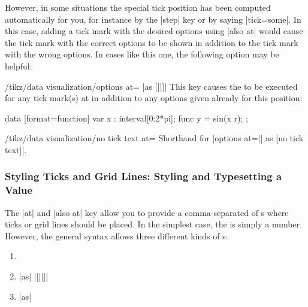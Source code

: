 However, in some situations the special tick position has been computed automatically for you, for instance by the |step| key or by saying |tick=some|. In this case, adding a tick mark with the desired options using |also at| would cause the tick mark with the correct options to be shown in addition to the tick mark with the wrong options. In cases like this one, the following option may be helpful:

\begin{key}{/tikz/data visualization/options at= |as [||]|}
    This key causes the  to be executed for any tick mark(s) at  in addition to any options given already for this position:
\begin{codeexample}[
    width=7cm,
    preamble={\usetikzlibrary{datavisualization.formats.functions}},
]
\tikz \datavisualization [
  scientific axes,
  visualize as smooth line,
  x axis={ticks={major={
    options at = 3    as [no tick text],
    also at    = (pi) as
      [{tick text padding=1ex}] $\pi$}}}]
data [format=function] {
  var x : interval[0:2*pi];
  func y = sin(\value x r);
};
\end{codeexample}
\end{key}

\begin{key}{/tikz/data visualization/no tick text at=}
    Shorthand for |options at=|| as [no tick text]|.
\end{key}


\subsubsection{Styling Ticks and Grid Lines: Styling and Typesetting a Value}
\label{section-dv-local-styles}
\label{section-dv-tick-labels}

The  |at| and |also at| key allow you to provide a comma-separated  of s where ticks or grid lines should be placed. In the simplest case, the  is simply a number. However, the general syntax allows three different kinds of s:
%
\begin{enumerate}
    \item {}
    \item {} |as| |[||]|
    \item {} |as|  
\end{enumerate}

